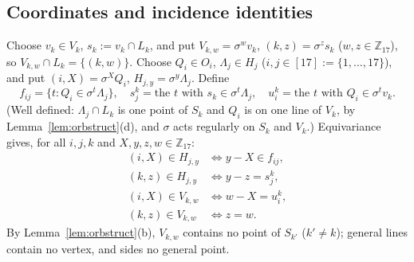 \documentclass[11pt,a4paper]{article}
\theoremstyle{definition}
\newcommand{\Zp}{\mathbb{Z}_{17}}
\begin{document}
\subsection{Coordinates and incidence identities}

Choose $v_k\in V_k$, $s_k:=v_k\cap L_k$, and put $V_{k,w}=\sigma^wv_k$, $(k,z)=\sigma^zs_k$ ($w,z\in\Zp$), so $V_{k,w}\cap L_k=\{(k,w)\}$. Choose $Q_i\in O_i$, $\Lambda_j\in H_j$ ($i,j\in[17]:=\{1,\dots,17\}$), and put $(i,X)=\sigma^XQ_i$, $H_{j,y}=\sigma^y\Lambda_j$. Define
\[
f_{ij}=\{t:Q_i\in\sigma^t\Lambda_j\},\quad s^k_j=\text{the }t\text{ with }s_k\in\sigma^t\Lambda_j,\quad u^k_i=\text{the }t\text{ with }Q_i\in\sigma^tv_k .
\]
(Well defined: $\Lambda_j\cap L_k$ is one point of $S_k$ and $Q_i$ is on one line of $V_k$, by Lemma~\ref{lem:orbstruct}(d), and $\sigma$ acts regularly on $S_k$ and $V_k$.) Equivariance gives, for all $i,j,k$ and $X,y,z,w\in\Zp$:
\begin{align}
(i,X)\in H_{j,y}&\iff y-X\in f_{ij},\tag{I1}\\
(k,z)\in H_{j,y}&\iff y-z=s^k_j,\tag{I2}\\
(i,X)\in V_{k,w}&\iff w-X=u^k_i,\tag{I3}\\
(k,z)\in V_{k,w}&\iff z=w.\tag{I4}
\end{align}
By Lemma~\ref{lem:orbstruct}(b), $V_{k,w}$ contains no point of $S_{k'}$ ($k'\ne k$); general lines contain no vertex, and sides no general point.
\end{document}
